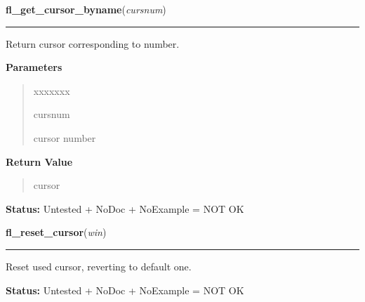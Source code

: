 \hspace{.8\funcindent}\begin{boxedminipage}{\funcwidth}

    \raggedright \textbf{fl\_get\_cursor\_byname}(\textit{cursnum})

    \vspace{-1.5ex}

    \rule{\textwidth}{0.5\fboxrule}
\setlength{\parskip}{2ex}
    Return cursor corresponding to number.

\setlength{\parskip}{1ex}
      \textbf{Parameters}
      \vspace{-1ex}

      \begin{quote}
        \begin{Ventry}{xxxxxxx}

          \item[cursnum]

          cursor number

        \end{Ventry}

      \end{quote}

      \textbf{Return Value}
    \vspace{-1ex}

      \begin{quote}
      cursor

      \end{quote}

\textbf{Status:} Untested + NoDoc + NoExample = NOT OK



    \end{boxedminipage}

    \label{xformslib:library:fl_reset_cursor}

    \vspace{0.5ex}

\hspace{.8\funcindent}\begin{boxedminipage}{\funcwidth}

    \raggedright \textbf{fl\_reset\_cursor}(\textit{win})

    \vspace{-1.5ex}

    \rule{\textwidth}{0.5\fboxrule}
\setlength{\parskip}{2ex}
    Reset used cursor, reverting to default one.

\setlength{\parskip}{1ex}
\textbf{Status:} Untested + NoDoc + NoExample = NOT OK



    \end{boxedminipage}

